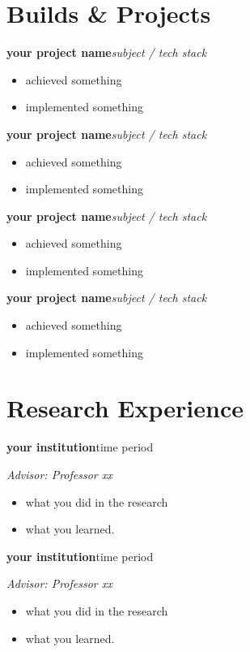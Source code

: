 \documentclass[10pt,a4paper]{article}
\newcommand{\project}[2]{%
  \vspace{3pt}%
  \noindent\textbf{#1}\hfill{\small\textit{#2}}\par
  \vspace{1pt}%
}
\newcommand{\entry}[2]{%
  \noindent\textbf{#1}\hfill{#2}\par
}
\begin{document}
\section{Builds \& Projects}

\project{your project name}{subject / tech stack}
\begin{itemize}
  \item achieved something
  \item implemented something
\end{itemize}

\project{your project name}{subject / tech stack}
\begin{itemize}
  \item achieved something
  \item implemented something
\end{itemize}

\project{your project name}{subject / tech stack}
\begin{itemize}
  \item achieved something
  \item implemented something
\end{itemize}

\project{your project name}{subject / tech stack}
\begin{itemize}
  \item achieved something
  \item implemented something
\end{itemize}


\section{Research Experience}

\entry{your institution}{time period}
\textit{Advisor: Professor xx}\
\begin{itemize}
  \item what you did in the research
  \item what you learned.
\end{itemize}

\entry{your institution}{time period}
\textit{Advisor: Professor xx}\
\begin{itemize}
  \item what you did in the research
  \item what you learned.
\end{itemize}
\end{document}
